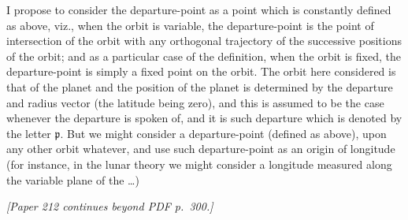 \documentclass[11pt]{article}
\begin{document}
I propose to consider the departure-point as a point which is constantly defined as above, viz., when the orbit is variable, the departure-point is the point of intersection of the orbit with any orthogonal trajectory of the successive positions of the orbit; and as a particular case of the definition, when the orbit is fixed, the departure-point is simply a fixed point on the orbit. The orbit here considered is that of the planet and the position of the planet is determined by the departure and radius vector (the latitude being zero), and this is assumed to be the case whenever the departure is spoken of, and it is such departure which is denoted by the letter $\mathfrak{p}$. But we might consider a departure-point (defined as above), upon any other orbit whatever, and use such departure-point as an origin of longitude (for instance, in the lunar theory we might consider a longitude measured along the variable plane of the \ldots)

\bigskip

\noindent\textit{[Paper 212 continues beyond PDF p.\ 300.]}
\end{document}

